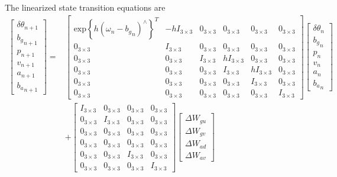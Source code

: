 \documentclass[10pt]{article}
\newcommand{\expb}[1]{\ensuremath{\mathrm{exp}\left\{#1\right\}}}
\begin{document}
The linearized state transition equations are
\begin{align}
	\begin{bmatrix} \delta\theta_{n+1} \\ {b_g}_{n+1} \\ p_{n+1} \\ v_{n+1} \\ a_{n+1} \\ {b_a}_{n+1} \end{bmatrix} = &\begin{bmatrix} \expb{h(\omega_n-{b_g}_n)^\wedge}^T & -hI_{3\times 3} & 0_{3\times 3} & 0_{3\times 3} & 0_{3\times 3} & 0_{3\times 3} \\ 0_{3\times 3} & I_{3\times 3} & 0_{3\times 3} & 0_{3\times 3} & 0_{3\times 3} & 0_{3\times 3} \\ 0_{3\times 3} & 0_{3\times 3} & I_{3\times 3} & hI_{3\times 3} & 0_{3\times 3} & 0_{3\times 3} \\ 0_{3\times 3} & 0_{3\times 3} & 0_{3\times 3} & I_{3\times 3} & hI_{3\times 3} & 0_{3\times 3} \\ 0_{3\times 3} & 0_{3\times 3} & 0_{3\times 3} & 0_{3\times 3} & I_{3\times 3} & 0_{3\times 3} \\ 0_{3\times 3} & 0_{3\times 3} & 0_{3\times 3} & 0_{3\times 3} & 0_{3\times 3} & I_{3\times 3} \end{bmatrix} \begin{bmatrix} \delta\theta_n \\ {b_g}_n \\ p_n \\ v_n \\ a_n \\ {b_a}_n \end{bmatrix} \nonumber \\
	&+ \begin{bmatrix} I_{3\times 3} & 0_{3\times 3} & 0_{3\times 3} & 0_{3\times 3} \\ 0_{3\times 3} & I_{3\times 3} & 0_{3\times 3} & 0_{3\times 3} \\ 0_{3\times 3} & 0_{3\times 3} & 0_{3\times 3} & 0_{3\times 3} \\ 0_{3\times 3} & 0_{3\times 3} & 0_{3\times 3} & 0_{3\times 3} \\ 0_{3\times 3} & 0_{3\times 3} & I_{3\times 3} & 0_{3\times 3} \\ 0_{3\times 3} & 0_{3\times 3} & 0_{3\times 3} & I_{3\times 3} \end{bmatrix} \begin{bmatrix} \Delta W_{gu} \\ \Delta W_{gv} \\ \Delta W_{ad} \\ \Delta W_{av} \end{bmatrix}
\end{align}
\end{document}
